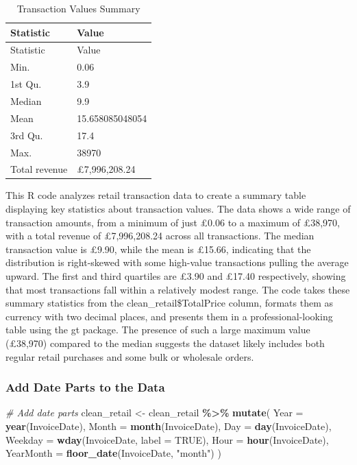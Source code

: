 \documentclass[
]{article}
\newenvironment{Shaded}{\begin{snugshade}}{\end{snugshade}}
\newcommand{\AttributeTok}[1]{\textcolor[rgb]{0.13,0.29,0.53}{#1}}
\newcommand{\CommentTok}[1]{\textcolor[rgb]{0.56,0.35,0.01}{\textit{#1}}}
\newcommand{\ConstantTok}[1]{\textcolor[rgb]{0.56,0.35,0.01}{#1}}
\newcommand{\FunctionTok}[1]{\textcolor[rgb]{0.13,0.29,0.53}{\textbf{#1}}}
\newcommand{\NormalTok}[1]{#1}
\newcommand{\OtherTok}[1]{\textcolor[rgb]{0.56,0.35,0.01}{#1}}
\newcommand{\SpecialCharTok}[1]{\textcolor[rgb]{0.81,0.36,0.00}{\textbf{#1}}}
\newcommand{\StringTok}[1]{\textcolor[rgb]{0.31,0.60,0.02}{#1}}
\begin{document}
\begin{longtable}[]{@{}ll@{}}
\caption{Transaction Values Summary}\tabularnewline
\toprule\noalign{}
Statistic & Value \\
\midrule\noalign{}
\endfirsthead
\toprule\noalign{}
Statistic & Value \\
\midrule\noalign{}
\endhead
\bottomrule\noalign{}
\endlastfoot
Min. & 0.06 \\
1st Qu. & 3.9 \\
Median & 9.9 \\
Mean & 15.658085048054 \\
3rd Qu. & 17.4 \\
Max. & 38970 \\
Total revenue & £7,996,208.24 \\
\end{longtable}

This R code analyzes retail transaction data to create a summary table
displaying key statistics about transaction values. The data shows a
wide range of transaction amounts, from a minimum of just £0.06 to a
maximum of £38,970, with a total revenue of £7,996,208.24 across all
transactions. The median transaction value is £9.90, while the mean is
£15.66, indicating that the distribution is right-skewed with some
high-value transactions pulling the average upward. The first and third
quartiles are £3.90 and £17.40 respectively, showing that most
transactions fall within a relatively modest range. The code takes these
summary statistics from the clean\_retail\$TotalPrice column, formats
them as currency with two decimal places, and presents them in a
professional-looking table using the gt package. The presence of such a
large maximum value (£38,970) compared to the median suggests the
dataset likely includes both regular retail purchases and some bulk or
wholesale orders.

\subsubsection{Add Date Parts to the
Data}\label{add-date-parts-to-the-data}

\begin{Shaded}
\begin{Highlighting}[]
\CommentTok{\# Add date parts}
\NormalTok{clean\_retail }\OtherTok{\textless{}{-}}\NormalTok{ clean\_retail }\SpecialCharTok{\%\textgreater{}\%}
  \FunctionTok{mutate}\NormalTok{(}
    \AttributeTok{Year =} \FunctionTok{year}\NormalTok{(InvoiceDate),}
    \AttributeTok{Month =} \FunctionTok{month}\NormalTok{(InvoiceDate),}
    \AttributeTok{Day =} \FunctionTok{day}\NormalTok{(InvoiceDate),}
    \AttributeTok{Weekday =} \FunctionTok{wday}\NormalTok{(InvoiceDate, }\AttributeTok{label =} \ConstantTok{TRUE}\NormalTok{),}
    \AttributeTok{Hour =} \FunctionTok{hour}\NormalTok{(InvoiceDate),}
    \AttributeTok{YearMonth =} \FunctionTok{floor\_date}\NormalTok{(InvoiceDate, }\StringTok{"month"}\NormalTok{)}
\NormalTok{  )}
\end{Highlighting}
\end{Shaded}
\end{document}
